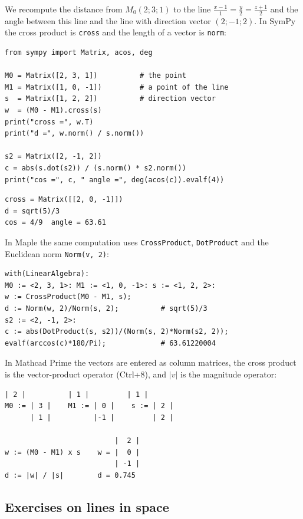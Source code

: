 We recompute the distance from $M_0(2;3;1)$ to the line
$\frac{x-1}{1}=\frac{y}{2}=\frac{z+1}{2}$ and the angle between this line and
the line with direction vector $(2;-1;2)$. In SymPy the cross product is
\texttt{cross} and the length of a vector is \texttt{norm}:
\begin{Verbatim}[fontsize=\footnotesize,frame=single,label={\small Python}]
from sympy import Matrix, acos, deg

M0 = Matrix([2, 3, 1])          # the point
M1 = Matrix([1, 0, -1])         # a point of the line
s  = Matrix([1, 2, 2])          # direction vector
w  = (M0 - M1).cross(s)
print("cross =", w.T)
print("d =", w.norm() / s.norm())

s2 = Matrix([2, -1, 2])
c = abs(s.dot(s2)) / (s.norm() * s2.norm())
print("cos =", c, " angle =", deg(acos(c)).evalf(4))
\end{Verbatim}
\begin{Verbatim}[fontsize=\footnotesize,frame=single,label={\small Output}]
cross = Matrix([[2, 0, -1]])
d = sqrt(5)/3
cos = 4/9  angle = 63.61
\end{Verbatim}
In Maple the same computation uses \texttt{CrossProduct}, \texttt{DotProduct}
and the Euclidean norm \texttt{Norm(v, 2)}:
\begin{Verbatim}[fontsize=\footnotesize,frame=single,label={\small Maple}]
with(LinearAlgebra):
M0 := <2, 3, 1>: M1 := <1, 0, -1>: s := <1, 2, 2>:
w := CrossProduct(M0 - M1, s);
d := Norm(w, 2)/Norm(s, 2);          # sqrt(5)/3
s2 := <2, -1, 2>:
c := abs(DotProduct(s, s2))/(Norm(s, 2)*Norm(s2, 2));
evalf(arccos(c)*180/Pi);             # 63.61220004
\end{Verbatim}
In Mathcad Prime the vectors are entered as column matrices, the cross
product is the vector-product operator (Ctrl+8), and $|v|$ is the
magnitude operator:
\begin{Verbatim}[fontsize=\footnotesize,frame=single,label={\small Mathcad}]
      | 2 |          | 1 |         | 1 |
M0 := | 3 |    M1 := | 0 |    s := | 2 |
      | 1 |          |-1 |         | 2 |

                          |  2 |
w := (M0 - M1) x s    w = |  0 |
                          | -1 |
d := |w| / |s|        d = 0.745
\end{Verbatim}

\subsection{Exercises on lines in space}

